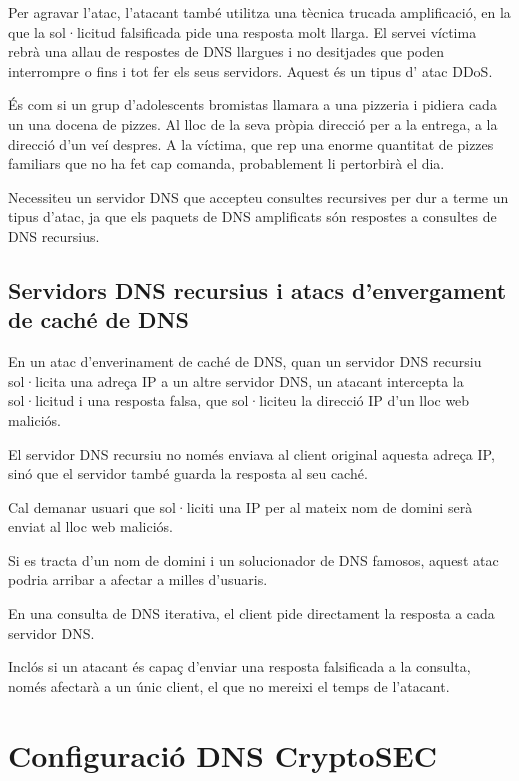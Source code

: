 \documentclass[]{article}
\begin{document}
Per agravar l'atac, l'atacant també utilitza una tècnica trucada
amplificació, en la que la sol·licitud falsificada pide una resposta
molt llarga. El servei víctima rebrà una allau de respostes de DNS
llargues i no desitjades que poden interrompre o fins i tot fer els seus
servidors. Aquest és un tipus d' atac DDoS.

És com si un grup d'adolescents bromistas llamara a una pizzeria i
pidiera cada un una docena de pizzes. Al lloc de la seva pròpia direcció
per a la entrega, a la direcció d'un veí despres. A la víctima, que rep
una enorme quantitat de pizzes familiars que no ha fet cap comanda,
probablement li pertorbirà el dia.

Necessiteu un servidor DNS que accepteu consultes recursives per dur a
terme un tipus d'atac, ja que els paquets de DNS amplificats són
respostes a consultes de DNS recursius.

\hypertarget{servidors-dns-recursius-i-atacs-denvergament-de-cachuxe9-de-dns}{%
\subsection{\texorpdfstring{\textbf{Servidors DNS recursius i atacs
d'envergament de caché de
DNS}}{Servidors DNS recursius i atacs d'envergament de caché de DNS}}\label{servidors-dns-recursius-i-atacs-denvergament-de-cachuxe9-de-dns}}

En un atac d'enverinament de caché de DNS, quan un servidor DNS recursiu
sol·licita una adreça IP a un altre servidor DNS, un atacant intercepta
la sol·licitud i una resposta falsa, que sol·liciteu la direcció IP d'un
lloc web maliciós.

El servidor DNS recursiu no només enviava al client original aquesta
adreça IP, sinó que el servidor també guarda la resposta al seu caché.

Cal demanar usuari que sol·liciti una IP per al mateix nom de domini
serà enviat al lloc web maliciós.

Si es tracta d'un nom de domini i un solucionador de DNS famosos, aquest
atac podria arribar a afectar a milles d'usuaris.

En una consulta de DNS iterativa, el client pide directament la resposta
a cada servidor DNS.

Inclós si un atacant és capaç d'enviar una resposta falsificada a la
consulta, només afectarà a un únic client, el que no mereixi el temps de
l'atacant.

\hypertarget{configuraciuxf3-dns-cryptosec}{%
\section{\texorpdfstring{\textbf{Configuració DNS
CryptoSEC}}{Configuració DNS CryptoSEC}}\label{configuraciuxf3-dns-cryptosec}}
\end{document}
